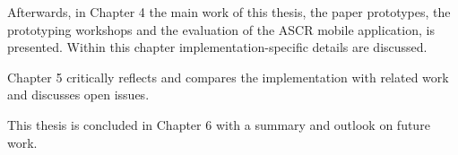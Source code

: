 Afterwards, in Chapter 4 the main work of this thesis, the paper prototypes, the prototyping workshops and the evaluation of the ASCR mobile application, is presented. Within this chapter implementation-specific details are discussed.


Chapter 5 critically reflects and compares the implementation with related work and discusses open issues.

This thesis is concluded in Chapter 6 with a summary and outlook on future work.

